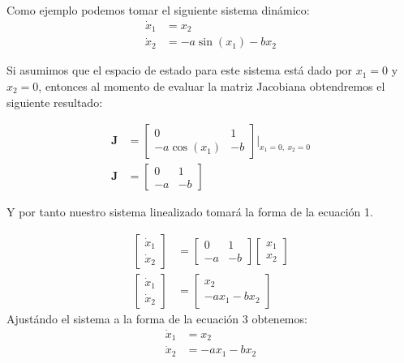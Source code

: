 \documentclass[12pt, letterpaper]{article}
\begin{document}
Como ejemplo podemos tomar el siguiente sistema dinámico:
\begin{equation}
	\begin{split}
		\dot x_1 &= x_2 \\
		\dot x_2 &= -a \sin(x_1) - bx_2
	\end{split}
\end{equation}

Si asumimos que el espacio de estado para este sistema está dado por $x_1 = 0$ y $x_2 = 0$, entonces al momento de evaluar la matriz Jacobiana obtendremos el siguiente resultado:

\begin{equation}
	\begin{split}
		\textbf{J} &=
	\begin{bmatrix}
		0 & 1 \\
		-a \cos(x_1) & -b
	\end{bmatrix} \Biggr \rvert_{x_1 = 0,\  x_2 = 0} \\
		\textbf{J} &=
	\begin{bmatrix}
		0 & 1 \\
		-a & -b
	\end{bmatrix}
	\end{split}
\end{equation}

Y por tanto nuestro sistema linealizado tomará la forma de la ecuación 1.

\begin{equation}
	\begin{split}
	\begin{bmatrix}
		\dot x_1 \\
		\dot x_2
	\end{bmatrix}
		&=
	\begin{bmatrix}
		0 & 1 \\
		-a & -b
	\end{bmatrix}
	\begin{bmatrix}
		x_1 \\
		x_2
	\end{bmatrix} \\
		\begin{bmatrix}
			\dot x_1 \\
			\dot x_2
		\end{bmatrix}
		&=
		\begin{bmatrix}
			x_2 \\
			-ax_1 - bx_2
		\end{bmatrix}
	\end{split}
\end{equation}
Ajustándo el sistema a la forma de la ecuación 3 obtenemos:
\begin{equation}
	\boxed{\begin{split}
		\dot x_1 &= x_2 \\
		\dot x_2 &= -ax_1 - bx_2
	\end{split}}
\end{equation}
\end{document}
